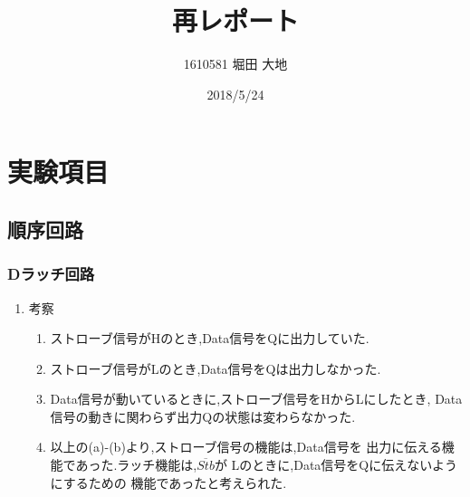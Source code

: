 \documentclass[twocolumn, 10pt,a4j]{jsarticle}
\title{\vspace{-2.5cm}再レポート}
\author{1610581 堀田 大地}
\date{2018/5/24}
\begin{document}
\maketitle{}
\vspace{-10zh}
\section{実験項目}
  \subsection{順序回路}
    \subsubsection{Dラッチ回路}
      \begin{enumerate}
        \item 考察 \\
          \begin{enumerate}
            \item ストローブ信号がHのとき,Data信号をQに出力していた.
            \item ストローブ信号がLのとき,Data信号をQは出力しなかった.
            \item Data信号が動いているときに,ストローブ信号をHからLにしたとき,
            Data信号の動きに関わらず出力Qの状態は変わらなかった.
            \item 以上の(a)-(b)より,ストローブ信号の機能は,Data信号を
            出力に伝える機能であった.ラッチ機能は,$\overline{Stb}$が
            Lのときに,Data信号をQに伝えないようにするための
            機能であったと考えられた.
          \end{enumerate}
      \end{enumerate}
\end{document}
